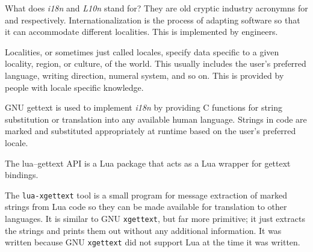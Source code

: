 

What does {\it i18n} and {\it L10n} stand for? They are old cryptic industry acronymns for  and  respectively. Internationalization is the process of adapting software so that it can accommodate different localities. This is implemented by engineers.

Localities, or sometimes just called locales, specify data specific to a given locality, region, or culture, of the world. This usually includes the user's preferred language, writing direction, numeral system, and so on. This is provided by people with locale specific knowledge.

\startitemize[4]

GNU gettext is used to implement {\it i18n} by providing C functions for string substitution or translation into any available human language. Strings in code are marked and substituted appropriately at runtime based on the user's preferred locale.


The lua--gettext API is a Lua package that acts as a Lua wrapper for gettext bindings.


The {\tt lua-xgettext} tool is a small program for message extraction of marked strings from Lua code so they can be made available for translation to other languages. It is similar to GNU {\tt xgettext}, but far more primitive; it just extracts the strings and prints them out without any additional information. It was written because GNU {\tt xgettext} did not support Lua at the time it was written.
\stopitemize

